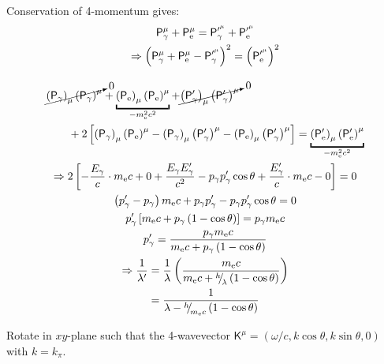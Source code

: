 \begin{parts}
	Conservation of 4-momentum gives:
	\begin{gather*}
		\mathsf{P}_\gamma^\mu + \mathsf{P}_\mathrm{e}^\mu = \mathsf{P}_\gamma^{\prime^\mu} + \mathsf{P}_\mathrm{e}^{\prime^\mu} \\
		\Rightarrow \rbracket{\mathsf{P}_\gamma^\mu + \mathsf{P}_\mathrm{e}^\mu - \mathsf{P}_\gamma^{\prime^\mu}}^2 = \rbracket{\mathsf{P}_\mathrm{e}^{\prime^\mu}}^2 \\[1em]
		\begin{aligned}
			&\cancelto{0}{\rbracket{\mathsf{P}_\gamma}_\mu \rbracket{\mathsf{P}_\gamma}^\mu}
			+ \underbracket{\rbracket{\mathsf{P}_\mathrm{e}}_\mu \rbracket{\mathsf{P}_\mathrm{e}}^\mu}_{-\masselectron^2 c^2}
			+ \cancelto{0}{\rbracket{\mathsf{P}^\prime_\gamma}_\mu \rbracket{\mathsf{P}^\prime_\gamma}^\mu}
			\\
			&\qquad + 2\sbracket{
				\rbracket{\mathsf{P}_\gamma}_\mu \rbracket{\mathsf{P}_\mathrm{e}}^\mu
				- \rbracket{\mathsf{P}_\gamma}_\mu \rbracket{\mathsf{P}_\gamma^\prime}^\mu
				- \rbracket{\mathsf{P}_\mathrm{e}}_\mu \rbracket{\mathsf{P}_\gamma^\prime}^\mu
			}
			= \underbracket{\rbracket{\mathsf{P}_\mathrm{e}^\prime}_\mu \rbracket{\mathsf{P}_\mathrm{e}^\prime}^\mu}_{-\masselectron^2 c^2}
		\end{aligned} \\
		\Rightarrow 2\sbracket{
			- \frac{E_\gamma}{c} \cdot \masselectron c + 0 + \frac{E_\gamma E_\gamma^\prime}{c^2}
			- p_\gamma p_\gamma^\prime \cos\theta + \frac{E_\gamma^\prime}{c} \cdot \masselectron c - 0
		} = 0 \\
		\rbracket{p_\gamma^\prime - p_\gamma} \masselectron c + p_\gamma p_\gamma^\prime - p_\gamma p_\gamma^\prime \cos\theta = 0 \\
		p_\gamma^\prime \sbracket{\masselectron c + p_\gamma \rbracket{1-\cos\theta}} = p_\gamma \masselectron c \\
		p_\gamma^\prime = \frac{p_\gamma \masselectron c}{\masselectron c + p_\gamma \rbracket{1-\cos\theta}} \\
		\Rightarrow \frac{1}{\lambda^\prime} = \frac{1}{\lambda} \rbracket{\frac{\masselectron c}{\masselectron c + \diagfrac{h}{\lambda} \rbracket{1-\cos\theta}}} \\
		= \frac{1}{\lambda - \diagfrac{h}{\masselectron c} \rbracket{1-\cos\theta}}
	\end{gather*}
	
	Rotate in $xy$-plane such that the 4-wavevector $\mathsf{K}^\mu = (\omega/c, k\cos\theta, k\sin\theta, 0)$ with $k=k_\pi$.
	

\end{parts}
